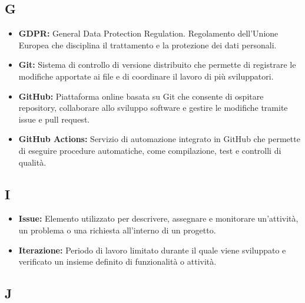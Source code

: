 
{}
\subsection*{G}

\begin{itemize}
    \item \textbf{GDPR:} General Data Protection Regulation. Regolamento dell'Unione Europea che disciplina il trattamento e la protezione dei dati personali.
    \item \textbf{Git:} Sistema di controllo di versione distribuito che permette di registrare le modifiche apportate ai file e di coordinare il lavoro di più sviluppatori.
    \item \textbf{GitHub:} Piattaforma online basata su Git che consente di ospitare repository, collaborare allo sviluppo software e gestire le modifiche tramite issue e pull request.
    \item \textbf{GitHub Actions:} Servizio di automazione integrato in GitHub che permette di eseguire procedure automatiche, come compilazione, test e controlli di qualità.
\end{itemize}



{}
\subsection*{I}

\begin{itemize}
    \item \textbf{Issue:} Elemento utilizzato per descrivere, assegnare e monitorare un'attività, un problema o una richiesta all'interno di un progetto.
    \item \textbf{Iterazione:} Periodo di lavoro limitato durante il quale viene sviluppato e verificato un insieme definito di funzionalità o attività.
\end{itemize}


{}
\subsection*{J}

